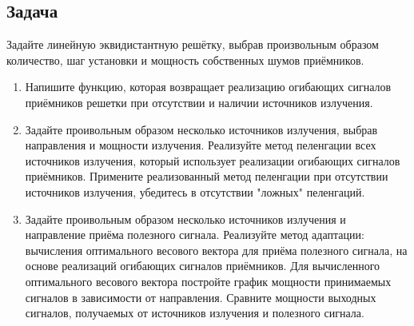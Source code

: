\documentclass[a4paper,12pt]{article}
\newenvironment{Matlab}{\par \vspace{0.2cm}}{\vspace{0.2cm} \par}
\newcommand{\Mcommand}[1]{\noindent \texttt{> #1} \par}
\newcommand{\matlab}[1]{\begin{Matlab} \Mcommand{#1} \end{Matlab}}
\begin{document}
\subsection{Задача}

Задайте линейную эквидистантную решётку, выбрав произвольным образом количество, шаг установки и мощность собственных шумов приёмников.

\begin{enumerate}
    \item Напишите функцию, которая возвращает реализацию огибающих сигналов приёмников решетки при отсутствии и наличии источников излучения.
    \item Задайте проивольным образом несколько источников излучения, выбрав направления и мощности излучения. Реализуйте метод пеленгации
          всех источников излучения, который использует реализации огибающих сигналов приёмников. Примените реализованный метод пеленгации
          при отсутствии источников излучения, убедитесь в отсутствии "ложных"{} пеленгаций.
    \item Задайте проивольным образом несколько источников излучения и направление приёма полезного сигнала. Реализуйте метод
          адаптации: вычисления оптимального весового вектора для приёма полезного сигнала, на основе реализаций огибающих сигналов приёмников.
          Для вычисленного оптимального весового вектора постройте график мощности принимаемых сигналов в зависимости от направления.
          Сравните мощности выходных сигналов, получаемых от источников излучения и полезного сигнала.
\end{enumerate}



\end{document}
